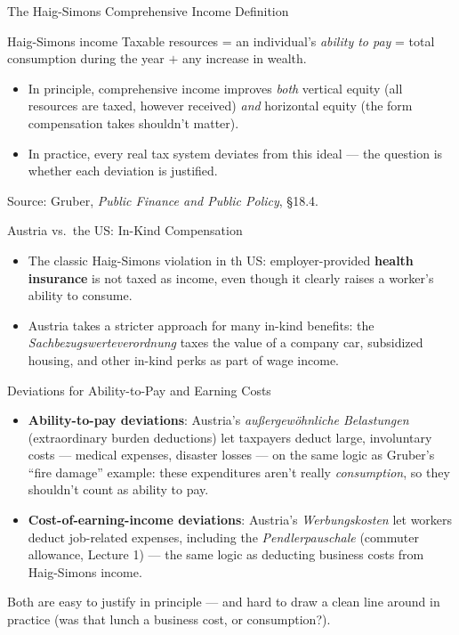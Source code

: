 \documentclass[11pt,aspectratio=169]{beamer}
\newcommand{\srcnote}[1]{{\footnotesize\color{wugray}Source: #1}}
\begin{document}
\begin{frame}{The Haig-Simons Comprehensive Income Definition}
  \begin{block}{Haig-Simons income}
    Taxable resources = an individual's \emph{ability to pay} = total consumption during the year \(+\) any increase in wealth.
  \end{block}
  \vspace{0.3em}
  \begin{itemize}
    \item In principle, comprehensive income improves \emph{both} vertical equity (all resources are taxed, however received) \emph{and} horizontal equity (the form compensation takes shouldn't matter).
    \item In practice, every real tax system deviates from this ideal --- the question is whether each deviation is justified.
  \end{itemize}
  \srcnote{Gruber, \emph{Public Finance and Public Policy}, \S18.4.}
\end{frame}

\begin{frame}{Austria vs.\ the US: In-Kind Compensation}
  \begin{itemize}
    \item The classic Haig-Simons violation in th US: employer-provided \textbf{health insurance} is not taxed as income, even though it clearly raises a worker's ability to consume.
    \item Austria takes a stricter approach for many in-kind benefits: the \emph{Sachbezugswerteverordnung} taxes the value of a company car, subsidized housing, and other in-kind perks as part of wage income.
  \end{itemize}

 
\end{frame}

\begin{frame}{Deviations for Ability-to-Pay and Earning Costs}
  \small
  \begin{itemize}
    \item \textbf{Ability-to-pay deviations}: Austria's \emph{außergewöhnliche Belastungen} (extraordinary burden deductions) let taxpayers deduct large, involuntary costs --- medical expenses, disaster losses --- on the same logic as Gruber's ``fire damage'' example: these expenditures aren't really \emph{consumption}, so they shouldn't count as ability to pay.
    \item \textbf{Cost-of-earning-income deviations}: Austria's \emph{Werbungskosten} let workers deduct job-related expenses, including the \emph{Pendlerpauschale} (commuter allowance, Lecture 1) --- the same logic as deducting business costs from Haig-Simons income.
  \end{itemize}
  \vspace{0.3em}
  \centering
  Both are easy to justify in principle --- and hard to draw a clean line around in practice (was that lunch a business cost, or consumption?).
\end{frame}
\end{document}
